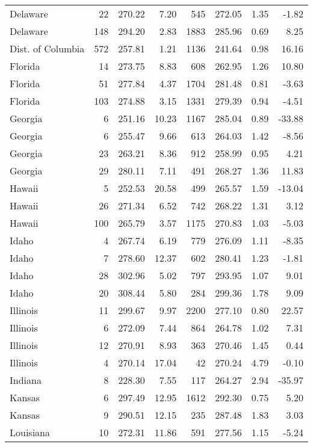 \begin{longtable}{lrrr@{\extracolsep{10pt}}rrrr}
  Delaware &  22 & 270.22 & 7.20 & 545 & 272.05 & 1.35 & -1.82 \\ 
  Delaware & 148 & 294.20 & 2.83 & 1883 & 285.96 & 0.69 & 8.25 \\ 
  Dist. of Columbia & 572 & 257.81 & 1.21 & 1136 & 241.64 & 0.98 & 16.16 \\ 
  Florida &  14 & 273.75 & 8.83 & 608 & 262.95 & 1.26 & 10.80 \\ 
  Florida &  51 & 277.84 & 4.37 & 1704 & 281.48 & 0.81 & -3.63 \\ 
  Florida & 103 & 274.88 & 3.15 & 1331 & 279.39 & 0.94 & -4.51 \\ 
  Georgia &   6 & 251.16 & 10.23 & 1167 & 285.04 & 0.89 & -33.88 \\ 
  Georgia &   6 & 255.47 & 9.66 & 613 & 264.03 & 1.42 & -8.56 \\ 
  Georgia &  23 & 263.21 & 8.36 & 912 & 258.99 & 0.95 & 4.21 \\ 
  Georgia &  29 & 280.11 & 7.11 & 491 & 268.27 & 1.36 & 11.83 \\ 
  Hawaii &   5 & 252.53 & 20.58 & 499 & 265.57 & 1.59 & -13.04 \\ 
  Hawaii &  26 & 271.34 & 6.52 & 742 & 268.22 & 1.31 & 3.12 \\ 
  Hawaii & 100 & 265.79 & 3.57 & 1175 & 270.83 & 1.03 & -5.03 \\ 
  Idaho &   4 & 267.74 & 6.19 & 779 & 276.09 & 1.11 & -8.35 \\ 
  Idaho &   7 & 278.60 & 12.37 & 602 & 280.41 & 1.23 & -1.81 \\ 
  Idaho &  28 & 302.96 & 5.02 & 797 & 293.95 & 1.07 & 9.01 \\ 
  Idaho &  20 & 308.44 & 5.80 & 284 & 299.36 & 1.78 & 9.09 \\ 
  Illinois &  11 & 299.67 & 9.97 & 2200 & 277.10 & 0.80 & 22.57 \\ 
  Illinois &   6 & 272.09 & 7.44 & 864 & 264.78 & 1.02 & 7.31 \\ 
  Illinois &  12 & 270.91 & 8.93 & 363 & 270.46 & 1.45 & 0.44 \\ 
  Illinois &   4 & 270.14 & 17.04 &  42 & 270.24 & 4.79 & -0.10 \\ 
  Indiana &   8 & 228.30 & 7.55 & 117 & 264.27 & 2.94 & -35.97 \\ 
  Kansas &   6 & 297.49 & 12.95 & 1612 & 292.30 & 0.75 & 5.20 \\ 
  Kansas &   9 & 290.51 & 12.15 & 235 & 287.48 & 1.83 & 3.03 \\ 
  Louisiana &  10 & 272.31 & 11.86 & 591 & 277.56 & 1.15 & -5.24 \\ 

\end{longtable}
